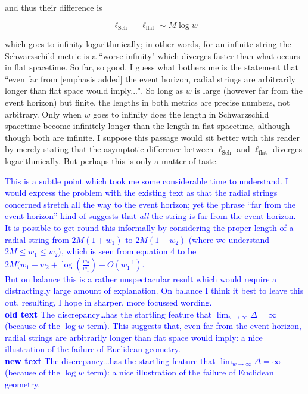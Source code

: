 \documentclass[12pt]{article}
\begin{document}
and thus their difference is

\[
\ell_\mathrm{Sch} - \ell_\mathrm{flat}\sim M\log w
\]

which goes to infinity logarithmically; in other words, for an
infinite string the Schwarzschild metric is a ``worse infinity" which
diverges faster than what occurs in flat spacetime.  So far, so good.
I guess what bothers me is the statement that ``even far from [emphasis
  added] the event horizon, radial strings are arbitrarily longer than
flat space would imply...".  So long as $w$ is large (however far from
the event horizon) but finite, the lengths in both metrics are precise
numbers, not arbitrary.  Only when $w$ goes to infinity does the
length in Schwarzschild spacetime become infinitely longer than the
length in flat spacetime, although though both are infinite.  I
suppose this passage would sit better with this reader by merely
stating that the asymptotic difference between $\ell_\mathrm{Sch}$ and
$\ell_\mathrm{flat}$ diverges logarithmically.  But perhaps this is
only a matter of taste.

\textcolor{blue}{This is a subtle point which took me some
  considerable time to understand.  I would express the problem with
  the existing text as that the radial strings concerned stretch all
  the way to the event horizon; yet the phrase ``far from the event
  horizon'' kind of suggests that {\em all} the string is far from the
  event horizon.\\ It is possible to get round this informally by
  considering the proper length of a radial string from $2M(1+w_1)$ to
  $2M(1+w_2)$ (where we understand $2M\leq w_1\leq w_2$), which is seen from
  equation 4 to be $2M(w_1-w_2 + \log\left(\frac{w_2}{w_1}\right) +
  O(w_1^{-1})$.\\ But on balance this is a rather unspectacular result
  which would require a distractingly large amount of explanation.  On
  balance I think it best to leave this out, resulting, I hope in
  sharper, more focussed wording.
\\ {\bf old text}
The discrepancy\ldots has the startling feature that
$\lim_{w\longrightarrow\infty}\Delta=\infty$ (because of the $\log w$
term).  This suggests that, even far from the event horizon, radial
strings are arbitrarily longer than flat space would imply: a nice
illustration of the failure of Euclidean geometry.
\\ {\bf new text}
The discrepancy\ldots has the startling feature that
$\lim_{w\longrightarrow\infty}\Delta=\infty$ (because of the $\log w$
term): a nice illustration of the failure of Euclidean geometry.
}
\end{document}
